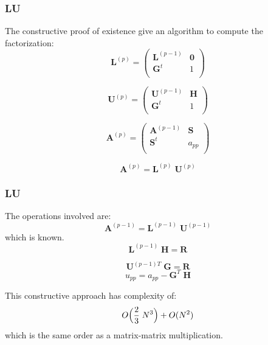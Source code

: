 \begin{frame}
  \frametitle{LU}

The constructive proof of existence give an algorithm to compute the factorization:
    \[
      \bm L^{(p)} =
      \begin{pmatrix}
        \bm L^{(p-1)} & \bm 0 \\
        \bm G^t &  1 \\
      \end{pmatrix}
    \]

    \[
      \bm U^{(p)} =
      \begin{pmatrix}
        \bm U^{(p-1)} & \bm H \\
        \bm G^t & 1 \\
      \end{pmatrix}
    \]

    \[
      \bm A^{(p)} =
      \begin{pmatrix}
        \bm A^{(p-1)} & \bm S \\
        \bm S^t & a_{pp} \\
      \end{pmatrix}
    \]

    \[
       \bm A^{(p)} = \bm L^{(p)} \;\bm U^{(p)}
    \]
\end{frame}

\begin{frame}
  \frametitle{LU}

The operations involved are:
    \[
       \bm A^{(p-1)} = \bm L^{(p-1)} \;\bm U^{(p-1)}
    \]
which is known.
    \[
       \bm L^{(p-1)} \; \bm H = \bm R
    \]

    \[
       \bm U^{(p-1)T} \; \bm G = \bm R
    \]
    \[
       u_{pp} = a_{pp} - \bm G^T \;\bm H
    \]

\medskip
This constructive approach has complexity of:
    \[
      O\Bigl(\dfrac{2}{3}\;N^3\Bigr) + O(N^2)
    \]
which is the same order as a matrix-matrix multiplication.
\end{frame}

